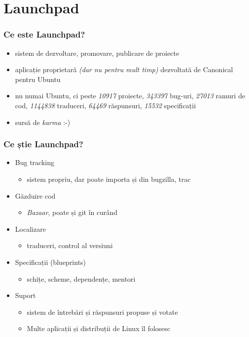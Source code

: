 \documentclass{beamer}
\begin{document}
\section{Launchpad}
\frame{\tableofcontents[currentsection]}

\begin{frame}
\frametitle{Ce este Launchpad?}
\begin{itemize}
\pause \item sistem de dezvoltare, promovare, publicare de proiecte
\pause \item aplicație proprietară \emph{(dar nu pentru mult timp)} dezvoltată de Canonical pentru Ubuntu
\pause \item nu numai Ubuntu, ci peste \emph{10917} proiecte, \emph{343397} bug-uri, \emph{27013} ramuri de cod, \emph{1144838} traduceri, \emph{64469} răspunsuri, \emph{15532} specificații
\pause \item sursă de \emph{karma} :-)
\end{itemize}
\end{frame} 

\begin{frame}
\frametitle{Ce știe Launchpad?}
\begin{itemize}
\pause \item Bug tracking
\begin{itemize}
\item sistem propriu, dar poate importa și din bugzilla, trac
\end{itemize}
\pause \item Găzduire cod 
\begin{itemize}
\item	\emph{Bazaar}, poate și git în curând
\end{itemize}
\pause \item Localizare
\begin{itemize}
\item traduceri, control al versiuni
\end{itemize}
\pause \item Specificații (blueprints)
\begin{itemize}
\item schițe, scheme, dependențe, mentori
\end{itemize}
\pause \item Suport
\begin{itemize}
\item sistem de întrebări și răspunsuri propuse și votate
\newline
\item Multe aplicații și distribuții de Linux îl folosesc %
\end{itemize}
\end{itemize}
\end{frame}
\end{document}
